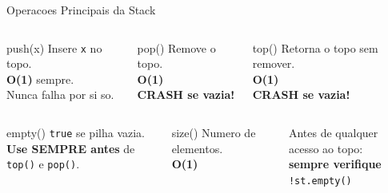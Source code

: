 \documentclass[aspectratio=169,11pt]{beamer}
\begin{document}
\begin{frame}{Operacoes Principais da Stack}
  \begin{columns}[t]
      \begin{exampleblock}{push(x)}
        \small
        Insere \texttt{x} no topo.\\[4pt]
        \textbf{O(1)} sempre.\\[4pt]
        Nunca falha por si so.
      \end{exampleblock}
      \begin{alertblock}{pop()}
        \small
        Remove o topo.\\[4pt]
        \textbf{O(1)}\\[4pt]
        \textcolor{gemaRed}{\textbf{CRASH se vazia!}}
      \end{alertblock}
      \begin{block}{top()}
        \small
        Retorna o topo sem remover.\\[4pt]
        \textbf{O(1)}\\[4pt]
        \textcolor{gemaRed}{\textbf{CRASH se vazia!}}
      \end{block}
  \end{columns}
  \vspace{0.2cm}
  \begin{columns}[t]
      \begin{block}{empty()}
        \small
        \texttt{true} se pilha vazia.\\[4pt]
        \textbf{Use SEMPRE antes} de \texttt{top()} e \texttt{pop()}.
      \end{block}
      \begin{block}{size()}
        \small
        Numero de elementos.\\[4pt]
        \textbf{O(1)}
      \end{block}
      \begin{tcolorbox}[caixaVerde,title={Dica de Prova}]
        \small
        Antes de qualquer acesso ao topo:\\[3pt]
        \textbf{sempre verifique}\\
        \texttt{!st.empty()}
      \end{tcolorbox}
  \end{columns}
\end{frame}
\end{document}
